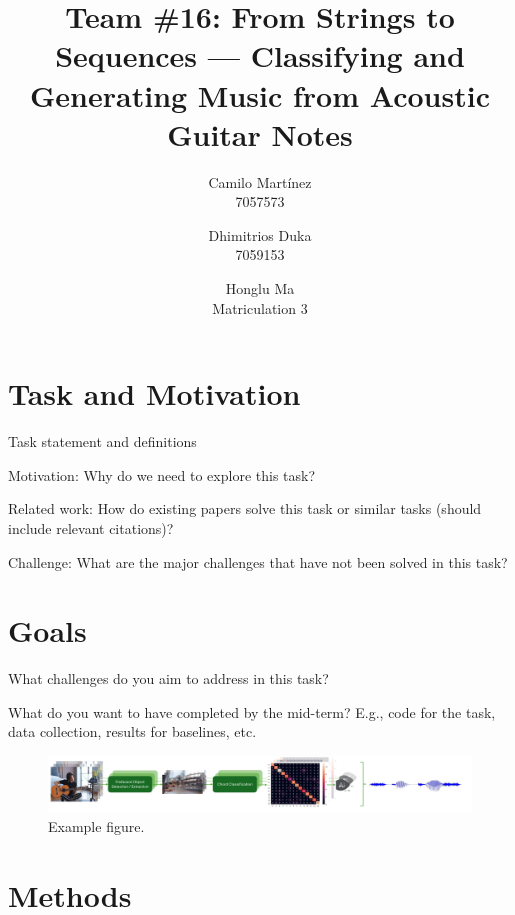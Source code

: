 \documentclass[10pt,twocolumn,letterpaper]{article}
\begin{document}
\title{Team \#16: From Strings to Sequences --- Classifying and Generating Music from Acoustic Guitar Notes}

\author{
Camilo Martínez\\
7057573\\
\and
Dhimitrios Duka\\
7059153\\
\and
Honglu Ma\\
Matriculation 3\\
}
\maketitle

\section{Task and Motivation}

Task statement and definitions

Motivation: Why do we need to explore this task?

Related work: How do existing papers solve this task or similar tasks (should include relevant citations)?

Challenge: What are the major challenges that have not been solved in this task?

\cite{Kristian_Zaman_Tenoyo_Jodhinata_2024}
\cite{du2023conditional}

\section{Goals}

What challenges do you aim to address in this task?

What do you want to have completed by the mid-term? E.g., code for the task, data collection, results for baselines, etc.


\begin{figure}[h]\label{fig:diagram}
    \centering
    \includegraphics[width=\textwidth]{images/task-diagram.pdf}
    \caption{Example figure.}
    \label{fig:figure1}
\end{figure}


\section{Methods}
\end{document}

